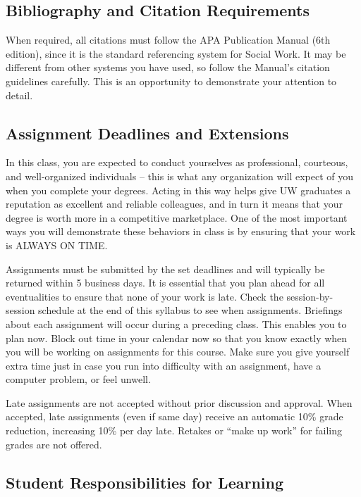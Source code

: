 \documentclass[11pt,]{article}
\begin{document}
\subsection{Bibliography and Citation
Requirements}\label{bibliography-and-citation-requirements}

When required, all citations must follow the APA Publication Manual (6th
edition), since it is the standard referencing system for Social Work.
It may be different from other systems you have used, so follow the
Manual's citation guidelines carefully. This is an opportunity to
demonstrate your attention to detail.

\subsection{Assignment Deadlines and
Extensions}\label{assignment-deadlines-and-extensions}

In this class, you are expected to conduct yourselves as professional,
courteous, and well-organized individuals -- this is what any
organization will expect of you when you complete your degrees. Acting
in this way helps give UW graduates a reputation as excellent and
reliable colleagues, and in turn it means that your degree is worth more
in a competitive marketplace. One of the most important ways you will
demonstrate these behaviors in class is by ensuring that your work is
ALWAYS ON TIME.

Assignments must be submitted by the set deadlines and will typically be
returned within 5 business days. It is essential that you plan ahead for
all eventualities to ensure that none of your work is late. Check the
session-by-session schedule at the end of this syllabus to see when
assignments. Briefings about each assignment will occur during a
preceding class. This enables you to plan now. Block out time in your
calendar now so that you know exactly when you will be working on
assignments for this course. Make sure you give yourself extra time just
in case you run into difficulty with an assignment, have a computer
problem, or feel unwell.

Late assignments are not accepted without prior discussion and approval.
When accepted, late assignments (even if same day) receive an automatic
10\% grade reduction, increasing 10\% per day late. Retakes or ``make up
work'' for failing grades are not offered.

\subsection{Student Responsibilities for
Learning}\label{student-responsibilities-for-learning}
\end{document}
